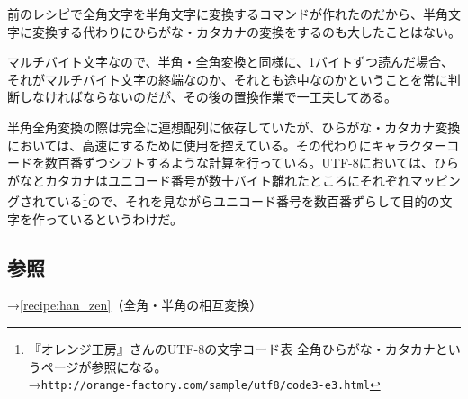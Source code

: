 前のレシピで全角文字を半角文字に変換するコマンドが作れたのだから、半角文字に変換する代わりにひらがな・カタカナの変換をするのも大したことはない。

マルチバイト文字なので、半角・全角変換と同様に、1バイトずつ読んだ場合、それがマルチバイト文字の終端なのか、それとも途中なのかということを常に判断しなければならないのだが、その後の置換作業で一工夫してある。

半角全角変換の際は完全に連想配列に依存していたが、ひらがな・カタカナ変換においては、高速にするために使用を控えている。その代わりにキャラクターコードを数百番ずつシフトするような計算を行っている。UTF-8においては、ひらがなとカタカナはユニコード番号が数十バイト離れたところにそれぞれマッピングされている\footnote{『オレンジ工房』さんのUTF-8の文字コード表 全角ひらがな・カタカナというページが参照になる。 \\ →\verb|http://orange-factory.com/sample/utf8/code3-e3.html|}ので、それを見ながらユニコード番号を数百番ずらして目的の文字を作っているというわけだ。

\subsection*{参照}

\noindent
→\ref{recipe:han_zen}（全角・半角の相互変換）
